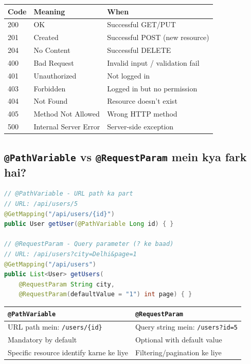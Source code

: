 \documentclass[12pt,a4paper]{article}
\begin{document}
\begin{answerbox}
\begin{center}
\begin{tabular}{l l l}
\toprule
\textbf{Code} & \textbf{Meaning} & \textbf{When} \\
\midrule
200 & OK & Successful GET/PUT \\
201 & Created & Successful POST (new resource) \\
204 & No Content & Successful DELETE \\
400 & Bad Request & Invalid input / validation fail \\
401 & Unauthorized & Not logged in \\
403 & Forbidden & Logged in but no permission \\
404 & Not Found & Resource doesn't exist \\
405 & Method Not Allowed & Wrong HTTP method \\
500 & Internal Server Error & Server-side exception \\
\bottomrule
\end{tabular}
\end{center}
\end{answerbox}

\subsection{\texttt{@PathVariable} vs \texttt{@RequestParam} mein kya fark hai?}

\begin{answerbox}
\begin{lstlisting}[language=Java]
// @PathVariable - URL path ka part
// URL: /api/users/5
@GetMapping("/api/users/{id}")
public User getUser(@PathVariable Long id) { }

// @RequestParam - Query parameter (? ke baad)
// URL: /api/users?city=Delhi&page=1
@GetMapping("/api/users")
public List<User> getUsers(
    @RequestParam String city,
    @RequestParam(defaultValue = "1") int page) { }
\end{lstlisting}
\begin{center}
\begin{tabular}{p{6cm} p{6cm}}
\toprule
\textbf{\texttt{@PathVariable}} & \textbf{\texttt{@RequestParam}} \\
\midrule
URL path mein: \texttt{/users/\{id\}} & Query string mein: \texttt{/users?id=5} \\
Mandatory by default & Optional with default value \\
Specific resource identify karne ke liye & Filtering/pagination ke liye \\
\bottomrule
\end{tabular}
\end{center}
\end{answerbox}
\end{document}
